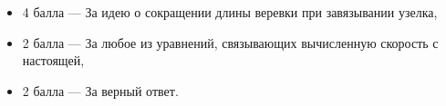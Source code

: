 \begin{itemize}
	\item{4 балла} --- За идею о сокращении длины веревки при завязывании узелка,
	\item{2 балла} --- За любое из уравнений, связывающих вычисленную скорость с настоящей,
	\item{2 балла} --- За верный ответ.
\end{itemize}